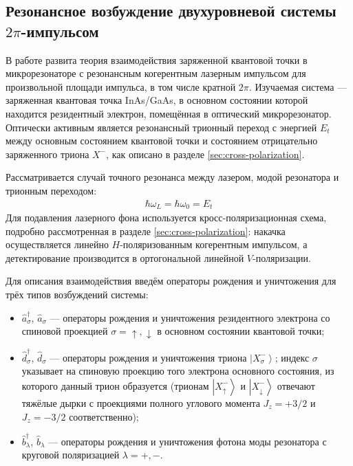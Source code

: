 \documentclass[11pt]{article}    %
\numberwithin{equation}{section}
\begin{document}
\subsection{Резонансное возбуждение двухуровневой системы $2\pi$-импульсом}
\label{sec:krainov}

В работе \cite{krainov2025} развита теория взаимодействия
заряженной квантовой точки в микрорезонаторе с резонансным когерентным
лазерным импульсом для произвольной площади импульса, в том числе
кратной $2\pi$. Изучаемая система --- заряженная квантовая точка
InAs/GaAs, в основном состоянии которой находится резидентный электрон,
помещённая в оптический микрорезонатор. Оптически активным является
резонансный трионный переход с энергией $E_t$ между основным
состоянием квантовой точки и состоянием отрицательно заряженного
триона $X^-$, как описано в разделе \ref{sec:cross-polarization}.

Рассматривается случай точного резонанса между лазером, модой
резонатора и трионным переходом:
\begin{gather}
    \hbar\omega_L = \hbar\omega_0 = E_t
\end{gather}
Для подавления лазерного фона используется кросс-поляризационная схема,
подробно рассмотренная в разделе \ref{sec:cross-polarization}: накачка
осуществляется линейно $H$-поляризованным когерентным импульсом, а
детектирование производится в ортогональной линейной $V$-поляризации.

Для описания взаимодействия введём операторы рождения и уничтожения
для трёх типов возбуждений системы:

\begin{itemize}
    \item $\hat{a}^{\dag}_{\sigma}$, $\hat{a}_{\sigma}$ --- операторы
    рождения и уничтожения резидентного электрона со спиновой проекцией
    $\sigma = \uparrow, \downarrow$ в основном состоянии квантовой точки;

    \item $\hat{d}^{\dag}_{\sigma}$, $\hat{d}_{\sigma}$ --- операторы
    рождения и уничтожения триона $\left|X^-_{\sigma}\right\rangle$;
    индекс $\sigma$ указывает на спиновую проекцию того электрона
    основного состояния, из которого данный трион образуется (трионам
    $\left|X^-_{\uparrow}\right\rangle$ и $\left|X^-_{\downarrow}\right\rangle$
    отвечают тяжёлые дырки с проекциями полного углового момента
    $J_z = +3/2$ и $J_z = -3/2$ соответственно);

    \item $\hat{b}^{\dag}_{\lambda}$, $\hat{b}_{\lambda}$ --- операторы
    рождения и уничтожения фотона моды резонатора с круговой поляризацией
    $\lambda = +, -$.
\end{itemize}
\end{document}
